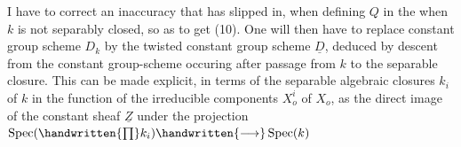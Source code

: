 I have to correct an inaccuracy that has slipped in, when defining $Q$ in the  when $k$ is not separably closed, so as to get (10). One will then have to replace  constant group scheme $D_k$ by the twisted constant group scheme $\underline{D}$, deduced by descent from the constant group-scheme occuring after passage from $k$ to the separable closure.  This can be made explicit, in terms of the separable algebraic closures  $k_i$ of $k$ in the function  of the irreducible components $X_o^i$ of $X_o$, as the  direct image of the constant sheaf $\underline{Z}$ under the projection $\operatorname{Spec}(\handwritten{\prod}k_i)\handwritten{\longrightarrow}\operatorname{Spec}(k)$

